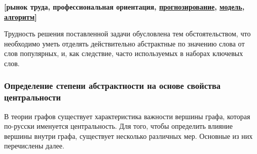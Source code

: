     \textbf{[рынок труда, профессиональная ориентация, \underline{прогнозирование}, \underline{модель}, \underline{алгоритм}]}\

Трудность решения поставленной задачи обусловлена тем обстоятельством, что необходимо уметь отделять действительно абстрактные по значению слова от слов популярных, и, как следствие, часто используемых в наборах ключевых слов.

\subsubsection{Определение степени абстрактности на основе свойства центральности}
В теории графов существует характеристика важности вершины графа, которая по-русски именуется центральность. Для того, чтобы определить влияние вершины внутри графа, существует несколько различных мер. Основные из них перечислены далее.
